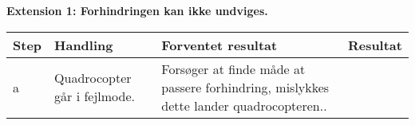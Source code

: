 \textbf{Extension 1: Forhindringen kan ikke undviges.}
\begin{table}[H]
	\centering
		\begin{tabular}{|l|p{5 cm}|p{5 cm}|p{3.5 cm}|} 
		\hline
			Step & Handling & Forventet resultat & Resultat\\ \hline
			a & Quadrocopter går i fejlmode. & Forsøger at finde måde at passere forhindring, mislykkes dette lander quadrocopteren.. & \\ \hline
		\end{tabular}
\end{table}


